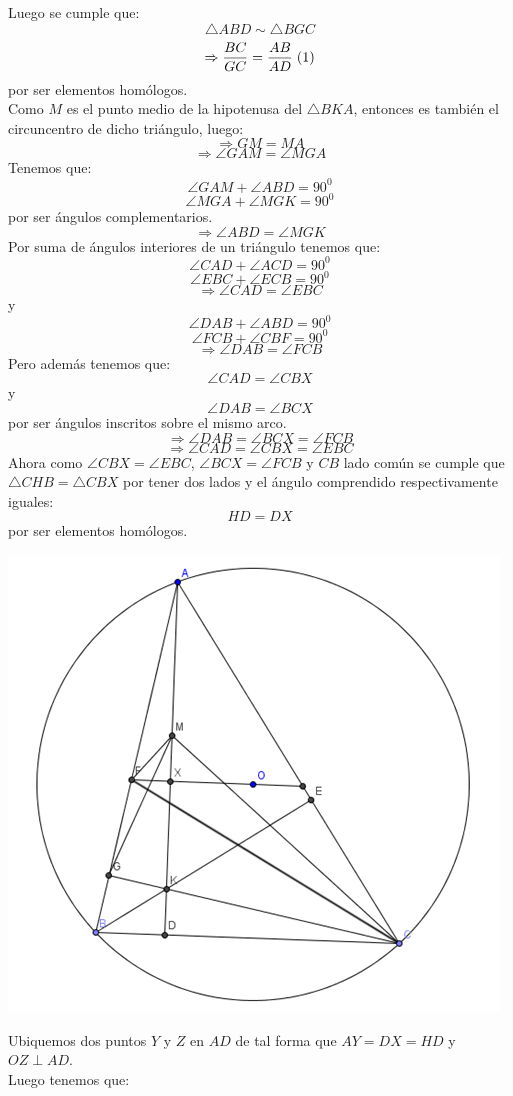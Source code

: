 \documentclass{book}
\begin{document}
\begin{enumerate}
\begin{center}
					\end{center}
					Luego se cumple que:
$$\triangle ABD\sim\triangle BGC$$
$$\Rightarrow{BC\over GC}={AB\over AD} \; (1)$$
por ser elementos homólogos.\\
Como $M$ es el punto medio de la hipotenusa del $\triangle BKA$, entonces es también el circuncentro de dicho triángulo, luego:
$$\Rightarrow GM=MA$$
$$\Rightarrow\angle GAM=\angle MGA$$
Tenemos que:
$$\angle GAM+\angle ABD=90^0$$
$$\angle MGA+\angle MGK=90^0$$
por ser ángulos complementarios.
$$\Rightarrow\angle ABD=\angle MGK$$
Por suma de ángulos interiores de un triángulo tenemos que:
$$\angle CAD+\angle ACD=90^0$$
$$\angle EBC+\angle ECB=90^0$$
$$\Rightarrow\angle CAD=\angle EBC$$
y
$$\angle DAB+\angle ABD=90^0$$
$$\angle FCB+\angle CBF=90^0$$
$$\Rightarrow\angle DAB=\angle FCB$$
Pero además tenemos que:
$$\angle CAD=\angle CBX$$
y
$$\angle DAB=\angle BCX$$
por ser ángulos inscritos sobre el mismo arco.
$$\Rightarrow\angle DAB=\angle BCX=\angle FCB$$
$$\Rightarrow\angle CAD=\angle CBX=\angle EBC$$
Ahora como $\angle CBX=\angle EBC$, $\angle BCX=\angle FCB$ y $CB$ lado común se cumple que $\triangle CHB=\triangle CBX$ por tener dos lados y el ángulo comprendido respectivamente iguales:
$$HD=DX$$
por ser elementos homólogos.
					\begin{center}
						\includegraphics[scale=1]{imagenes/Geometria/21,2.png}
					\end{center}
					Ubiquemos dos puntos $Y$ y $Z$ en $AD$ de tal forma que $AY=DX=HD$ y $OZ\perp AD$.\\ Luego tenemos que:

\end{enumerate}
\end{document}

